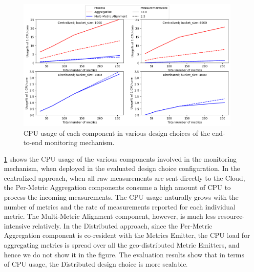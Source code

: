 \begin{figure}
\centering
\includegraphics[width=\linewidth]{figures/design_space/monitoring/cpu_usage.png}
\caption{CPU usage of each component in various design choices of the end-to-end monitoring mechanism.}
\label{fig:monitoring_cpu_usage}
\end{figure}
\cref{fig:monitoring_cpu_usage} shows the CPU usage of the various components involved in the monitoring mechanism, when deployed in the evaluated design choice configuration. In the centralized approach, when all raw measurements are sent directly to the Cloud, the Per-Metric Aggregation components consume a high amount of CPU to process the incoming measurements. The CPU usage naturally grows with the number of metrics and the rate of measurements reported for each individual metric. The Multi-Metric Alignment component, however, is much less resource-intensive relatively. In the Distributed approach, since the Per-Metric Aggregation component is co-resident with the Metrics Emitter, the CPU load for aggregating metrics is spread over all the geo-distributed Metric Emitters, and hence we do not show it in the figure. The evaluation results show that in terms of CPU usage, the Distributed design choice is more scalable.

